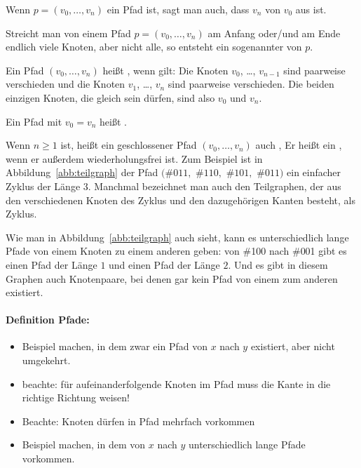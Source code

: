 Wenn $p=(v_0,\dots, v_n)$ ein Pfad ist, sagt man auch, dass $v_n$ von
$v_0$ aus  ist.

Streicht man von einem Pfad $p=(v_0,\dots, v_n)$ am Anfang oder/und am
Ende endlich viele Knoten, aber nicht alle, so entsteht ein sogenannter
 von $p$.

Ein Pfad $(v_0,\dots, v_n)$ heißt , wenn gilt: Die Knoten $v_0$, \dots, $v_{n-1}$ sind paarweise
verschieden und die Knoten $v_1$, \dots, $v_n$ sind paarweise
verschieden.
% 
Die beiden einzigen Knoten, die gleich sein dürfen, sind also $v_0$
und $v_n$.

Ein Pfad mit $v_0=v_n$ heißt .

Wenn $n\geq 1$ ist, heißt ein geschlossener Pfad $(v_0,\dots, v_n)$
auch ,
% 
Er heißt ein , wenn er außerdem wiederholungsfrei
ist.
% 
Zum Beispiel ist in Abbildung~\ref{abb:teilgraph} der Pfad $(\#{011},$
$\#{110},$ $\#{101},$ $\#{011})$ ein einfacher Zyklus der Länge $3$.
% 
Manchmal bezeichnet man auch den Teilgraphen, der aus den
verschiedenen Knoten des Zyklus und den dazugehörigen Kanten besteht,
als Zyklus.

Wie man in Abbildung~\ref{abb:teilgraph} auch sieht, kann es
unterschiedlich lange Pfade von einem Knoten zu einem anderen geben:
von \#{100} nach \#{001} gibt es einen Pfad der Länge $1$ und einen
Pfad der Länge $2$.
% 
Und es gibt in diesem Graphen auch Knotenpaare, bei denen gar kein
Pfad von einem zum anderen existiert. 

\begin{tutorium} 
  \paragraph{Definition Pfade:}
  \begin{itemize}
  \item Beispiel machen, in dem zwar ein Pfad von $x$ nach $y$
existiert, aber nicht umgekehrt.
  \item beachte: für aufeinanderfolgende Knoten im Pfad muss die Kante
in die richtige Richtung weisen!
  \item Beachte: Knoten dürfen in Pfad mehrfach vorkommen
  \item Beispiel machen, in dem von $x$ nach $y$ unterschiedlich lange
Pfade vorkommen.
  \end{itemize}
\end{tutorium}

